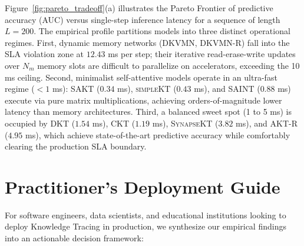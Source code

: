 \documentclass[11pt]{article}
\begin{document}
Figure~\ref{fig:pareto_tradeoff}(a) illustrates the Pareto Frontier of predictive accuracy (AUC) versus single-step inference latency for a sequence of length $L = 200$. The empirical profile partitions models into three distinct operational regimes. First, dynamic memory networks (\textsc{DKVMN}, \textsc{DKVMN-R}) fall into the SLA violation zone at $12.43$ ms per step; their iterative read-erase-write updates over $N_m$ memory slots are difficult to parallelize on accelerators, exceeding the 10 ms ceiling. Second, minimalist self-attentive models operate in an ultra-fast regime ($< 1$ ms): \textsc{SAKT} ($0.34$ ms), \textsc{simpleKT} ($0.43$ ms), and \textsc{SAINT} ($0.88$ ms) execute via pure matrix multiplications, achieving orders-of-magnitude lower latency than memory architectures. Third, a balanced sweet spot (1 to 5 ms) is occupied by \textsc{DKT} ($1.54$ ms), \textsc{CKT} ($1.19$ ms), \textsc{SynapseKT} ($3.82$ ms), and \textsc{AKT-R} ($4.95$ ms), which achieve state-of-the-art predictive accuracy while comfortably clearing the production SLA boundary.

\section{Practitioner's Deployment Guide}
\label{sec:guide}

For software engineers, data scientists, and educational institutions looking to deploy Knowledge Tracing in production, we synthesize our empirical findings into an actionable decision framework:
\end{document}
